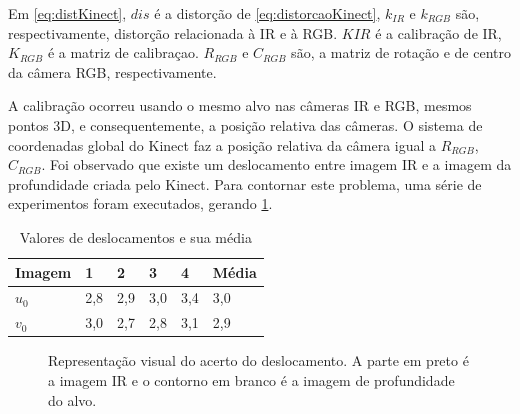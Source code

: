 Em \ref{eq:distKinect}, $dis$ é a distorção de \ref{eq:distorcaoKinect}, $k_{IR}$ e $k_{RGB}$ são, respectivamente, distorção relacionada à IR e à RGB. 
$K{IR}$ é a calibração de IR, $K_{RGB}$ é a matriz de calibraçao. $R_{RGB}$ e $C_{RGB}$ são, a matriz de rotação e de centro da câmera RGB, respectivamente.

A calibração ocorreu usando o mesmo alvo nas câmeras IR e RGB, mesmos pontos 3D, e consequentemente, a posição relativa das câmeras.
O sistema de coordenadas global do Kinect faz a posição relativa da câmera igual a $R_{RGB}$, $C_{RGB}$.
Foi observado que existe um deslocamento entre imagem IR e a imagem da profundidade criada pelo Kinect. Para contornar este problema, uma série de experimentos foram executados, gerando \ref{tab:deslocamentoKinect}.

\begin{table}[!h]
\centering
\caption{Valores de deslocamentos e sua média}
\label{tab:deslocamentoKinect}
\begin{tabular}{|l|l|l|l|l|l|}
\hline
Imagem & 1   & 2   & 3   & 4   & Média \\ \hline
$u_0$  & 2,8 & 2,9 & 3,0 & 3,4 & 3,0   \\ \hline
$v_0$  & 3,0 & 2,7 & 2,8 & 3,1 & 2,9   \\ \hline
\end{tabular}
\end{table}

\begin{figure}[!h]
	\centering
	\caption{%
	Representação visual do acerto do deslocamento. A parte em preto é a imagem IR e o contorno em branco é a imagem de profundidade do alvo.
	}\label{fig:deslocKinect}
\end{figure}

